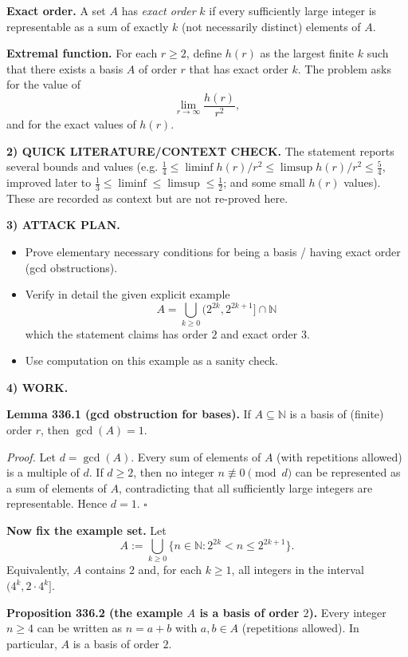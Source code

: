 \medskip
\noindent\textbf{Exact order.}
A set $A$ has \emph{exact order} $k$ if every sufficiently large integer is representable as a sum of exactly $k$ (not necessarily distinct) elements of $A$.

\medskip
\noindent\textbf{Extremal function.}
For each $r\ge 2$, define $h(r)$ as the largest finite $k$ such that there exists a basis $A$ of order $r$ that has exact order $k$.
The problem asks for the value of
\[
\lim_{r\to\infty} \frac{h(r)}{r^2},
\]
and for the exact values of $h(r)$.

\medskip
\noindent\textbf{2) QUICK LITERATURE/CONTEXT CHECK.}
The statement reports several bounds and values (e.g. $\tfrac14\le\liminf h(r)/r^2\le \limsup h(r)/r^2\le\tfrac54$, improved later to $\tfrac13\le\liminf\le\limsup\le\tfrac12$; and some small $h(r)$ values). These are recorded as context but are not re-proved here.

\medskip
\noindent\textbf{3) ATTACK PLAN.}
\begin{itemize}
\item Prove elementary necessary conditions for being a basis / having exact order (gcd obstructions).
\item Verify in detail the given explicit example
\[A=\bigcup_{k\ge 0}\bigl(2^{2k},2^{2k+1}\bigr]\cap\mathbb{N}\]
which the statement claims has order $2$ and exact order $3$.
\item Use computation on this example as a sanity check.
\end{itemize}

\medskip
\noindent\textbf{4) WORK.}

\medskip
\noindent\textbf{Lemma 336.1 (gcd obstruction for bases).}
If $A\subseteq\mathbb{N}$ is a basis of (finite) order $r$, then $\gcd(A)=1$.

\noindent\emph{Proof.}
Let $d=\gcd(A)$. Every sum of elements of $A$ (with repetitions allowed) is a multiple of $d$. If $d\ge 2$, then no integer $n\not\equiv 0\pmod d$ can be represented as a sum of elements of $A$, contradicting that all sufficiently large integers are representable. Hence $d=1$.
\hfill$\square$

\medskip
\noindent\textbf{Now fix the example set.}
Let
\[
A:=\bigcup_{k\ge 0}\bigl\{n\in\mathbb{N}: 2^{2k} < n \le 2^{2k+1}\bigr\}.
\]
Equivalently, $A$ contains $2$ and, for each $k\ge 1$, all integers in the interval $(4^k,2\cdot 4^k]$.

\medskip
\noindent\textbf{Proposition 336.2 (the example $A$ is a basis of order $2$).}
Every integer $n\ge 4$ can be written as $n=a+b$ with $a,b\in A$ (repetitions allowed). In particular, $A$ is a basis of order $2$.

